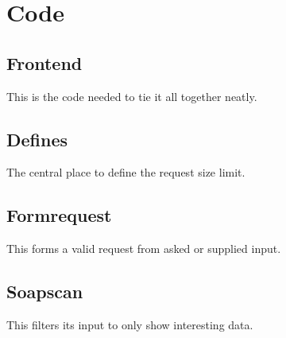 \documentclass[a4paper]{article}
\begin{document}
\section{Code}
\subsection{Frontend}
This is the code needed to tie it all together neatly.


\subsection{Defines}
The central place to define the request size limit.


\subsection{Formrequest}
This forms a valid request from asked or supplied input.


\subsection{Soapscan}
This filters its input to only show interesting data.

\end{document}
